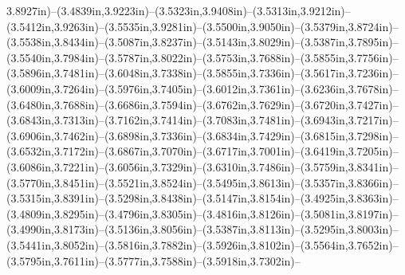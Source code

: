 3.8927in)--(3.4839in,3.9223in)--(3.5323in,3.9408in)--(3.5313in,3.9212in)--(3.5412in,3.9263in)--(3.5535in,3.9281in)--(3.5500in,3.9050in)--(3.5379in,3.8724in)--(3.5538in,3.8434in)--(3.5087in,3.8237in)--(3.5143in,3.8029in)--(3.5387in,3.7895in)--(3.5540in,3.7984in)--(3.5787in,3.8022in)--(3.5753in,3.7688in)--(3.5855in,3.7756in)--(3.5896in,3.7481in)--(3.6048in,3.7338in)--(3.5855in,3.7336in)--(3.5617in,3.7236in)--(3.6009in,3.7264in)--(3.5976in,3.7405in)--(3.6012in,3.7361in)--(3.6236in,3.7678in)--(3.6480in,3.7688in)--(3.6686in,3.7594in)--(3.6762in,3.7629in)--(3.6720in,3.7427in)--(3.6843in,3.7313in)--(3.7162in,3.7414in)--(3.7083in,3.7481in)--(3.6943in,3.7217in)--(3.6906in,3.7462in)--(3.6898in,3.7336in)--(3.6834in,3.7429in)--(3.6815in,3.7298in)--(3.6532in,3.7172in)--(3.6867in,3.7070in)--(3.6717in,3.7001in)--(3.6419in,3.7205in)--(3.6086in,3.7221in)--(3.6056in,3.7329in)--(3.6310in,3.7486in)--(3.5759in,3.8341in)--(3.5770in,3.8451in)--(3.5521in,3.8524in)--(3.5495in,3.8613in)--(3.5357in,3.8366in)--(3.5315in,3.8391in)--(3.5298in,3.8438in)--(3.5147in,3.8154in)--(3.4925in,3.8363in)--(3.4809in,3.8295in)--(3.4796in,3.8305in)--(3.4816in,3.8126in)--(3.5081in,3.8197in)--(3.4990in,3.8173in)--(3.5136in,3.8056in)--(3.5387in,3.8113in)--(3.5295in,3.8003in)--(3.5441in,3.8052in)--(3.5816in,3.7882in)--(3.5926in,3.8102in)--(3.5564in,3.7652in)--(3.5795in,3.7611in)--(3.5777in,3.7588in)--(3.5918in,3.7302in)--
